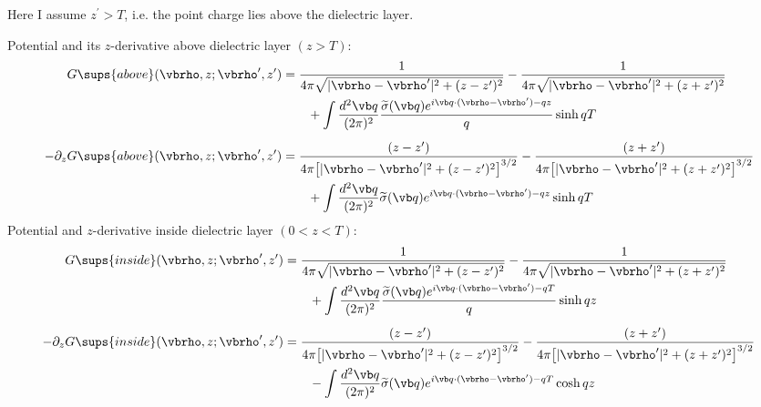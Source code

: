 \documentclass[letterpaper]{article}
\renewcommand{\wt}{\widetilde}
\begin{document}
Here I assume $z^\prime>T$, i.e. the point charge lies above the dielectric
layer.

Potential and its $z$-derivative above dielectric layer $(z>T)$:
\begin{align}
 G\sups{above}(\vbrho, z; \vbrho^\prime, z^\prime)
  &=\frac{1}{4\pi\sqrt{|\vbrho-\vbrho^\prime|^2 + (z-z^\prime)^2}}
   -\frac{1}{4\pi\sqrt{|\vbrho-\vbrho^\prime|^2 + (z+z^\prime)^2}}
\\
 &\qquad+ \int \frac{d^2 \vb q}{(2\pi)^2}
          \frac{\wt \sigma(\vb q)e^{i\vb q \cdot (\vbrho-\vbrho^\prime)-qz}}{q}\sinh qT
\\[5pt]
 -\partial_z
G\sups{above}(\vbrho, z; \vbrho^\prime, z^\prime)
  &= \frac{(z-z^\prime)}{4\pi\big[|\vbrho-\vbrho^\prime|^2 + (z-z^\prime)^2\big]^{3/2}}
    -\frac{(z+z^\prime)}{4\pi\big[|\vbrho-\vbrho^\prime|^2 + (z+z^\prime)^2\big]^{3/2}}
\\
  &\qquad+ \int \frac{d^2 \vb q}{(2\pi)^2}
          \wt \sigma(\vb q)e^{i\vb q \cdot (\vbrho-\vbrho^\prime)-qz}\sinh qT
\label{dzdGAbove}
\end{align}
\noindent Potential and $z$-derivative inside dielectric layer $(0<z<T)$:
\begin{align}
 G\sups{inside}(\vbrho, z; \vbrho^\prime, z^\prime)
  &=\frac{1}{4\pi\sqrt{|\vbrho-\vbrho^\prime|^2 + (z-z^\prime)^2}}
   -\frac{1}{4\pi\sqrt{|\vbrho-\vbrho^\prime|^2 + (z+z^\prime)^2}}
\\
 &\qquad+\int \frac{d^2 \vb q}{(2\pi)^2}
          \frac{\wt \sigma(\vb q)e^{i\vb q \cdot (\vbrho-\vbrho^\prime)-qT}}{q}\sinh qz
\\[5pt]
-\partial_z G\sups{inside}(\vbrho, z; \vbrho^\prime, z^\prime)
  &= \frac{(z-z^\prime)}{4\pi\big[|\vbrho-\vbrho^\prime|^2 + (z-z^\prime)^2\big]^{3/2}}
    -\frac{(z+z^\prime)}{4\pi\big[|\vbrho-\vbrho^\prime|^2 + (z+z^\prime)^2\big]^{3/2}}
\\
  &\qquad- \int \frac{d^2 \vb q}{(2\pi)^2}
          \wt \sigma(\vb q)e^{i\vb q \cdot (\vbrho-\vbrho^\prime)-qT}\cosh qz
\label{dzdGBelow}
\end{align}
\end{document}
